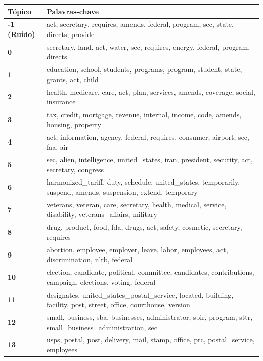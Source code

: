 \begin{table}[htpb]
    \centering
    \scriptsize
    \begin{tabularx}{\textwidth}{@{}l X@{}}
        \toprule
        \textbf{Tópico} & \textbf{Palavras-chave} \\
        \midrule
        \textbf{-1 (Ruído)} & act, secretary, requires, amends, federal, program, sec, state, directs, provide \\
        \textbf{0} & secretary, land, act, water, sec, requires, energy, federal, program, directs \\
        \textbf{1} & education, school, students, programs, program, student, state, grants, act, child \\
        \textbf{2} & health, medicare, care, act, plan, services, amends, coverage, social, insurance \\
        \textbf{3} & tax, credit, mortgage, revenue, internal, income, code, amends, housing, property \\
        \textbf{4} & act, information, agency, federal, requires, consumer, airport, sec, faa, air \\
        \textbf{5} & sec, alien, intelligence, united\_states, iran, president, security, act, secretary, congress \\
        \textbf{6} & harmonized\_tariff, duty, schedule, united\_states, temporarily, suspend, amends, suspension, extend, temporary \\
        \textbf{7} & veterans, veteran, care, secretary, health, medical, service, disability, veterans\_affairs, military \\
        \textbf{8} & drug, product, food, fda, drugs, act, safety, cosmetic, secretary, requires \\
        \textbf{9} & abortion, employee, employer, leave, labor, employees, act, discrimination, nlrb, federal \\
        \textbf{10} & election, candidate, political, committee, candidates, contributions, campaign, elections, voting, federal \\
        \textbf{11} & designates, united\_states\_postal\_service, located, building, facility, post, street, office, courthouse, version \\
        \textbf{12} & small, business, sba, businesses, administrator, sbir, program, sttr, small\_business\_administration, sec \\
        \textbf{13} & usps, postal, post, delivery, mail, stamp, office, prc, postal\_service, employees \\

\end{tabularx}
\end{table}
